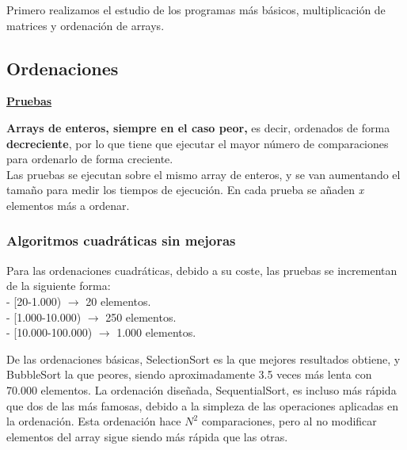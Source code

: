 Primero realizamos el estudio de los programas más básicos, multiplicación de matrices y ordenación de arrays.

	\subsection{Ordenaciones}
	
	\begin{flushleft}
	\begin{mdframed}[roundcorner=5pt]
	
		\textbf{\underline{Pruebas}}
		\vspace{0.1cm}
		
		\scriptsize	
		\textbf{Arrays de enteros, siempre en el caso peor,} es decir, ordenados de forma \textbf{decreciente}, por lo que tiene que ejecutar el mayor número de comparaciones para ordenarlo de forma creciente.\\	
		Las pruebas se ejecutan sobre el mismo array de enteros, y se van aumentando el tamaño para medir los tiempos de ejecución. En cada prueba se añaden \textit{x} elementos más a ordenar.	
		
		
	\end{mdframed}
	\end{flushleft}	
	
	
		\subsubsection{Algoritmos cuadráticas sin mejoras}		
		
		\begin{tcolorbox}[boxrule=0.5pt, fontupper=\small]
			\scriptsize
			Para las ordenaciones cuadráticas, debido a su coste, las pruebas se incrementan de la siguiente forma:\\
			- [20-1.000) $\rightarrow$ 20 elementos.\\
			- [1.000-10.000) $\rightarrow$ 250 elementos.\\
			- [10.000-100.000) $\rightarrow$ 1.000 elementos.		
		\end{tcolorbox}
		
			
		
		De las ordenaciones básicas, SelectionSort es la que mejores resultados obtiene, y BubbleSort la que peores, siendo aproximadamente 3.5 veces más lenta con 70.000 elementos. 
		La ordenación diseñada, SequentialSort, es incluso más rápida que dos de las más famosas, debido a la simpleza de las operaciones aplicadas en la ordenación. Esta ordenación hace \(N^{2}\) comparaciones, pero al no modificar elementos del array sigue siendo más rápida que las otras.
		
